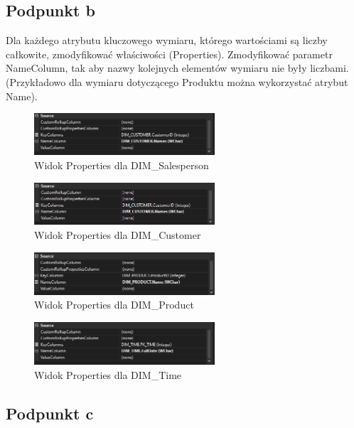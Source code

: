 \documentclass[a4paper,12pt]{article}
\begin{document}
\subsection{Podpunkt b}

Dla każdego atrybutu kluczowego wymiaru, którego wartościami są liczby całkowite,
zmodyfikować właściwości (Properties). Zmodyfikować parametr NameColumn, tak
aby nazwy kolejnych elementów wymiaru nie były liczbami. (Przykładowo dla wymiaru dotyczącego Produktu można wykorzystać atrybut Name).

\begin{figure}[H]
  \centering
  \includegraphics[width=0.6\textwidth]{1b_salesperson.png}
  \caption{Widok Properties dla DIM\_Salesperson}
\end{figure}

\begin{figure}[H]
  \centering
  \includegraphics[width=0.6\textwidth]{1b_customer.png}
  \caption{Widok Properties dla DIM\_Customer}
\end{figure}

\begin{figure}[H]
  \centering
  \includegraphics[width=0.6\textwidth]{1b_product.png}
  \caption{Widok Properties dla DIM\_Product}
\end{figure}

\begin{figure}[H]
  \centering
  \includegraphics[width=0.6\textwidth]{1b_time.png}
  \caption{Widok Properties dla DIM\_Time}
\end{figure}

\subsection{Podpunkt c}
\end{document}
